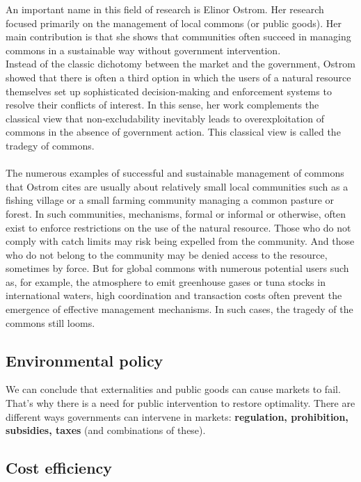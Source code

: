 \documentclass[../summary.tex]{subfiles}
\begin{document}
	  An important name in this field of research is Elinor Ostrom. Her research focused primarily on the management of local commons (or public goods). Her main contribution is that she shows that communities often succeed in managing commons in a sustainable way without government intervention.
	  \\
	  Instead of the classic dichotomy between the market and the government, Ostrom showed that there is often a third option in which the users of a natural resource themselves set up sophisticated decision-making and enforcement systems to resolve their conflicts of interest. In this sense, her work complements the classical view that non-excludability inevitably leads to overexploitation of commons in the absence of government action. This classical view is called the tradegy of commons. 
	  \\\\
	  The numerous examples of successful and sustainable management of commons that Ostrom cites are usually about relatively small local communities such as a fishing village or a small farming community managing a common pasture or forest. In such communities, mechanisms, formal or informal or otherwise, often exist to enforce restrictions on the use of the natural resource. Those who do not comply with catch limits may risk being expelled from the community. And those who do not belong to the community may be denied access to the resource, sometimes by force. But for global commons with numerous potential users such as, for example, the atmosphere to emit greenhouse gases or tuna stocks in international waters, high coordination and transaction costs often prevent the emergence of effective management mechanisms. In such cases, the tragedy of the commons still looms.
	  
	  \subsection{Environmental policy}
	  
	  We can conclude that externalities and public goods can cause markets to fail. That's why there is a need for public intervention to restore optimality. There are different ways governments can intervene in markets: \textbf{regulation, prohibition, subsidies, taxes} (and combinations of these).
	  
	  \subsection{Cost efficiency}
	    
\end{document}
